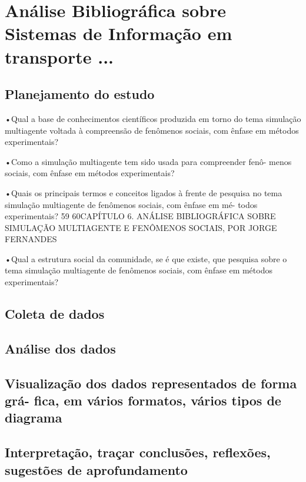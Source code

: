 \chapter{Análise Bibliográfica sobre Sistemas de Informação em transporte ...\label{chap:bibliometria:MoustacheGolem}}

\section{Planejamento do estudo}


•Qual a base de conhecimentos científicos produzida em torno do tema
simulação multiagente voltada à compreensão de fenômenos sociais,
com ênfase em métodos experimentais?

•Como a simulação multiagente tem sido usada para compreender fenô-
menos sociais, com ênfase em métodos experimentais?

•Quais os principais termos e conceitos ligados à frente de pesquisa no
tema simulação multiagente de fenômenos sociais, com ênfase em mé-
todos experimentais?
59
60CAPÍTULO 6. ANÁLISE BIBLIOGRÁFICA SOBRE SIMULAÇÃO MULTIAGENTE E FENÔMENOS SOCIAIS, POR JORGE FERNANDES

•Qual a estrutura social da comunidade, se é que existe, que pesquisa
sobre o tema simulação multiagente de fenômenos sociais, com ênfase
em métodos experimentais?
\section{Coleta de dados}

\section{Análise dos dados}

\section{Visualização dos dados representados de forma grá-
fica, em vários formatos, vários tipos de diagrama}

\section{Interpretação, traçar conclusões, reflexões, sugestões de
aprofundamento}
